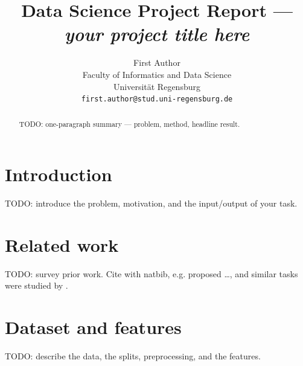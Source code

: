 \documentclass{article}
\title{Data Science Project Report --- \emph{your project title here}}
\author{%
  First Author \\
  Faculty of Informatics and Data Science\\
  Universität Regensburg\\
  \texttt{first.author@stud.uni-regensburg.de} \\
}
\begin{document}
\maketitle

\begin{abstract}
  TODO: one-paragraph summary --- problem, method, headline result.
\end{abstract}

\section{Introduction}
TODO: introduce the problem, motivation, and the input/output of your task.

\section{Related work}
TODO: survey prior work. Cite with natbib, e.g. \citet{hastie2009elements}
proposed \dots, and similar tasks were studied by \citet{chicco2020heartfailure}.

\section{Dataset and features}
TODO: describe the data, the splits, preprocessing, and the features.
\end{document}
